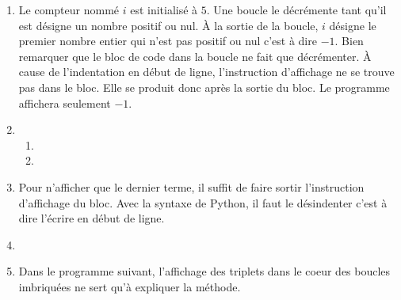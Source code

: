 \begin{enumerate}
  \item Le compteur nommé $i$ est initialisé à $5$. Une boucle le décrémente tant qu'il est désigne un nombre positif ou nul. \`A la sortie de la boucle, $i$ désigne le premier nombre entier qui n'est pas positif ou nul c'est à dire $-1$. Bien remarquer que le bloc de code dans la boucle ne fait que décrémenter. \`A cause de l'indentation en début de ligne, l'instruction d'affichage ne se trouve pas dans le bloc. Elle se produit donc après la sortie du bloc. Le programme affichera seulement $-1$.
  \item 
\begin{enumerate}
  \item 


  \item 

\end{enumerate}

  \item 


Pour n'afficher que le dernier terme, il suffit de faire sortir l'instruction d'affichage du bloc. Avec la syntaxe de Python, il faut le désindenter c'est à dire l'écrire en début de ligne.

  \item 


  \item Dans le programme suivant, l'affichage des triplets dans le coeur des boucles imbriquées ne sert qu'à expliquer la méthode.

\end{enumerate}
